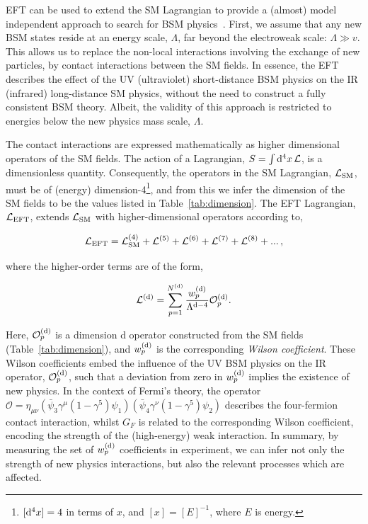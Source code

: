 EFT can be used to extend the SM Lagrangian to provide a (almost) model independent approach to search for BSM physics~\cite{Brivio:2017vri}. First, we assume that any new BSM states reside at an energy scale, $\Lambda$, far beyond the electroweak scale: $\Lambda \gg v$. This allows us to replace the non-local interactions involving the exchange of new particles, by contact interactions between the SM fields. In essence, the EFT describes the effect of the UV (ultraviolet) short-distance BSM physics on the IR (infrared) long-distance SM physics, without the need to construct a fully consistent BSM theory. Albeit, the validity of this approach is restricted to energies below the new physics mass scale, $\Lambda$.

The contact interactions are expressed mathematically as higher dimensional operators of the SM fields. The action of a Lagrangian, $S=\int {\rm{d}}^4x\,\mathcal{L}$, is a dimensionless quantity. Consequently, the operators in the SM Lagrangian, $\mathcal{L}_{\rm{SM}}$, must be of (energy) dimension-4\footnote{$[{\rm{d}}^4x]=4$ in terms of $x$, and $[x]=[E]^{-1}$, where $E$ is energy.}, and from this we infer the dimension of the SM fields to be the values listed in Table~\ref{tab:dimension}. The EFT Lagrangian, $\mathcal{L}_{\rm{EFT}}$, extends $\mathcal{L}_{\rm{SM}}$ with higher-dimensional operators according to,

\begin{equation}\label{eq:eft_expansion}
    \mathcal{L}_{\rm{EFT}} = \mathcal{L}^{\rm{(4)}}_{\rm{SM}} + \mathcal{L}^{\rm{(5)}} + \mathcal{L}^{\rm{(6)}} + \mathcal{L}^{\rm{(7)}} + \mathcal{L}^{\rm{(8)}} + {\rm{...}} \, ,
\end{equation}

\noindent
where the higher-order terms are of the form,

\begin{equation}\label{eq:eft_term}
    \mathcal{L}^{\rm{(d)}} = \sum^{N^{\rm{(d)}}}_{p=1} \frac{w^{\rm{(d)}}_p}{\Lambda^{{\rm{d}}-4}} \mathcal{O}^{\rm{(d)}}_p.
\end{equation}

\noindent
Here, $\mathcal{O}^{\rm{(d)}}_p$ is a dimension d operator constructed from the SM fields (Table~\ref{tab:dimension}), and $w^{\rm{(d)}}_p$ is the corresponding \textit{Wilson coefficient}. These Wilson coefficients embed the influence of the UV BSM physics on the IR operator, $\mathcal{O}^{\rm{(d)}}_p$, such that a deviation from zero in $w^{\rm{(d)}}_p$ implies the existence of new physics. In the context of Fermi's theory, the operator ${\mathcal{O}=\eta_{\mu\nu} (\bar{\psi}_3 \gamma^\mu(1-\gamma^5) \psi_1)(\bar{\psi}_4 \gamma^\nu(1-\gamma^5) \psi_2)}$ describes the four-fermion contact interaction, whilst $G_F$ is related to the corresponding Wilson coefficient, encoding the strength of the (high-energy) weak interaction. In summary, by measuring the set of $w^{\rm{(d)}}_p$ coefficients in experiment, we can infer not only the strength of new physics interactions, but also the relevant processes which are affected.

